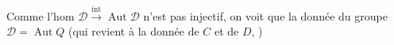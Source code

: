 Comme l'hom $\mathcal D\xrightarrow{\mathrm{int}}\operatorname{Aut}\mathcal D$ n'est pas injectif, on voit que la donnée du  groupe $\mathcal D=\operatorname{Aut}Q$ (qui revient à la donnée de $C$ et de $D$, ) 


